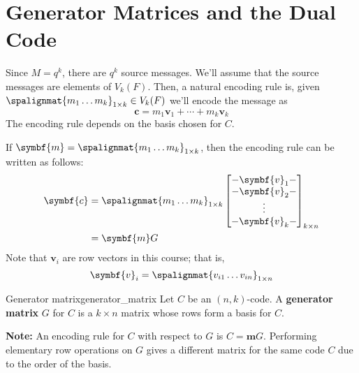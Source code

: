 \section{Generator Matrices and the Dual Code}

Since $ M=q^k $, there are $ q^k $ source messages. We'll assume that the source
messages are elements of $ V_k(F) $. Then, a natural encoding rule is,
given $ \spalignmat{m_1 \ldots{} m_k}_{1\times k}\in V_k(F) $ we'll encode the message as
\[ \symbf{c}=m_1\symbf{v}_1+\cdots+m_k\symbf{v}_k \]
The encoding rule depends on the basis chosen for $ C $.

If $ \symbf{m}=\spalignmat{m_1 \ldots{} m_k}_{1\times k} $,
then the encoding rule can be written as follows:
\begin{align*}
    \symbf{c} & =\spalignmat{m_1 \ldots{} m_k}_{1\times k}
    \begin{bmatrix}
        -\symbf{v}_1- \\
        -\symbf{v}_2- \\
        \vdots        \\
        -\symbf{v}_k-
    \end{bmatrix}_{k\times n}                 \\
              & =\symbf{m}G
\end{align*}
Note that $ \symbf{v}_i $ are row vectors in this course; that is,
\[ \symbf{v}_i=\spalignmat{v_{i1} \ldots{} v_{in}}_{1\times n} \]

\begin{Definition}{Generator matrix}{generator_matrix}
    Let $ C $ be an $ (n,k) $-code. A \textbf{generator matrix} $ G $
    for $ C $ is a $ k\times n $ matrix whose rows form a basis for $ C $.
\end{Definition}

\textbf{Note:} An encoding rule for $ C $ with respect to $ G $ is $ C=\symbf{m}G $.
Performing elementary row operations on $ G $ gives
a different matrix for the same code $ C $ due to the order of the basis.
